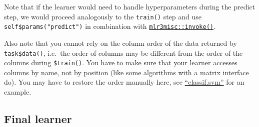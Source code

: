 \documentclass[]{scrbook}
\newenvironment{Shaded}{\begin{snugshade}}{\end{snugshade}}
\newcommand{\ControlFlowTok}[1]{\textcolor[rgb]{0.13,0.29,0.53}{\textbf{#1}}}
\newcommand{\DataTypeTok}[1]{\textcolor[rgb]{0.13,0.29,0.53}{#1}}
\newcommand{\KeywordTok}[1]{\textcolor[rgb]{0.13,0.29,0.53}{\textbf{#1}}}
\newcommand{\NormalTok}[1]{#1}
\newcommand{\OperatorTok}[1]{\textcolor[rgb]{0.81,0.36,0.00}{\textbf{#1}}}
\newcommand{\OtherTok}[1]{\textcolor[rgb]{0.56,0.35,0.01}{#1}}
\newcommand{\StringTok}[1]{\textcolor[rgb]{0.31,0.60,0.02}{#1}}
\renewenvironment{Shaded} {\begin{snugshade}\small} {\end{snugshade}}
\begin{document}
\begin{Shaded}
\end{Shaded}

Note that if the learner would need to handle hyperparameters during the predict step, we would proceed analogously to the \texttt{train()} step and use \texttt{self\$params("predict")} in combination with \href{https://mlr3misc.mlr-org.com/reference/invoke.html}{\texttt{mlr3misc::invoke()}}.

Also note that you cannot rely on the column order of the data returned by \texttt{task\$data()}, i.e.~the order of columns may be different from the order of the columns during \texttt{\$train()}.
You have to make sure that your learner accesses columns by name, not by position (like some algorithms with a matrix interface do).
You may have to restore the order manually here, see \href{https://github.com/mlr-org/mlr3learners/blob/master/R/LearnerClassifSVM.R}{``classif.svm''} for an example.

\hypertarget{final-learner}{%
\subsection{Final learner}\label{final-learner}}
\end{document}
